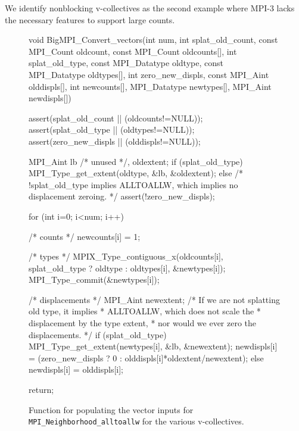 We identify nonblocking v-collectives as the second example
where MPI-3 lacks the necessary features to support large counts.

\begin{figure}
\begin{code}
void BigMPI_Convert_vectors(int num,
                            int splat_old_count,
                            const MPI_Count oldcount,
                            const MPI_Count oldcounts[],
                            int splat_old_type,
                            const MPI_Datatype oldtype,
                            const MPI_Datatype oldtypes[],
                            int zero_new_displs,
                            const MPI_Aint olddispls[],
                            int newcounts[],
                            MPI_Datatype newtypes[],
                            MPI_Aint newdispls[])
{
    assert(splat_old_count || (oldcounts!=NULL));
    assert(splat_old_type  || (oldtypes!=NULL));
    assert(zero_new_displs || (olddispls!=NULL));

    MPI_Aint lb /* unused */, oldextent;
    if (splat_old_type) {
        MPI_Type_get_extent(oldtype, &lb, &oldextent);
    } else {
        /* !splat_old_type implies ALLTOALLW, 
            which implies no displacement zeroing. */
        assert(!zero_new_displs);
    }

    for (int i=0; i<num; i++) {
        /* counts */
        newcounts[i] = 1;

        /* types */
        MPIX_Type_contiguous_x(oldcounts[i], 
                       splat_old_type ? oldtype : oldtypes[i], 
                       &newtypes[i]);
        MPI_Type_commit(&newtypes[i]);

        /* displacements */
        MPI_Aint newextent;
        /* If we are not splatting old type, it implies 
         *  ALLTOALLW, which does not scale the 
         * displacement by the type extent,
         * nor would we ever zero the displacements. */
        if (splat_old_type) {
            MPI_Type_get_extent(newtypes[i], &lb, &newextent);
            newdispls[i] = (zero_new_displs ? 0 : 
                            olddispls[i]*oldextent/newextent);
        } else {
            newdispls[i] = olddispls[i];
        }
    }
    return;
}
\end{code}
\label{code:BigMPI_Convert_vectors}
\caption{Function for populating the vector inputs 
for \texttt{MPI\_Neighborhood\_alltoallw} for the various v-collectives.}
\end{figure}


